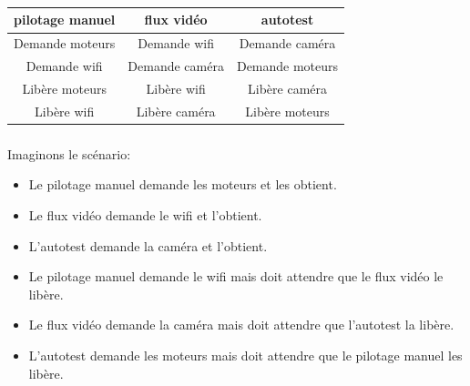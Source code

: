 \documentclass[svgnames,11pt]{beamer}
\begin{document}
\begin{frame}
    \frametitle{}

    \begin{center}
        \begin{tabular}{|*{3}{c|}}
            \hline
            \textbf{pilotage manuel} & \textbf{flux vidéo} & \textbf{autotest} \\
            \hline
            Demande moteurs          & Demande wifi        & Demande caméra    \\
            Demande wifi             & Demande caméra      & Demande moteurs   \\
            Libère moteurs           & Libère wifi         & Libère caméra     \\
            Libère wifi              & Libère caméra       & Libère moteurs    \\
            \hline
        \end{tabular}
    \end{center}

\end{frame}
\begin{frame}
    \frametitle{}

    Imaginons le scénario:
    \begin{itemize}
        \item Le pilotage manuel demande les moteurs et les obtient.
        \item Le flux vidéo demande le wifi et l'obtient.
        \item L'autotest demande la caméra et l'obtient.
        \item Le pilotage manuel demande le wifi mais doit attendre que le flux vidéo le libère.
        \item Le flux vidéo demande la caméra mais doit attendre que l'autotest la libère.
        \item L'autotest demande les moteurs mais doit attendre que le pilotage manuel les libère.
    \end{itemize}
    \begin{center}
    \end{center}
\end{frame}
\end{document}
